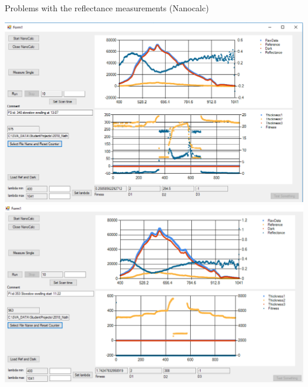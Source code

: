\documentclass[10pt]{beamer}
\begin{document}
\begin{frame}{Problems with the reflectance measurements (Nanocalc)}

\centering
\includegraphics[height=0.35\textheight]{badmeasure2.png}
\includegraphics[height=0.35\textheight]{badmeasure3.png}


\end{frame}
\end{document}
